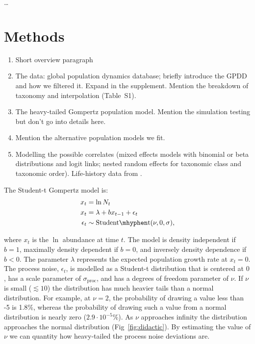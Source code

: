 \documentclass[12pt]{article}
\begin{document}
\citep{doak2008}

\citep{smale2013}

\citep{easterling2000}
\citep{scheffer2003}
\citep{katz2005}

\citep{taleb2007}

\citep{vasseur2014}

\citep{vert-pre2013}
\citep{lindenmayer2010}

\citep{valpine2002}
\citep{gregory2010}
\citet{garcia-carreras2011}
\citet{brook2006}
\citep{herrandoprez2014}

\citep{sibly2005, ziebarth2010}

\ldots

\section{Methods}

\begin{enumerate}
  \item Short overview paragraph
  \item The data: global population dynamics database; briefly introduce the GPDD and how we filtered it. Expand in the supplement. Mention the breakdown of taxonomy and interpolation (Table~S1).
  \item The heavy-tailed Gompertz population model. Mention the simulation testing but don't go into details here.
  \item Mention the alternative population models we fit.
  \item Modelling the possible correlates (mixed effects models with binomial or beta distributions and logit links; nested random effects for taxonomic class and taxonomic order). Life-history data from \citet{brook2006a}.
  \end{enumerate}


The Student-t Gompertz model is:
\begin{align*}
x_t &= \ln N_t\\
x_t &= \lambda + b x_{t-1} + \epsilon_t\\
\epsilon_t &\sim \mathrm{Student\mhyphen t}(\nu, 0, \sigma),
\end{align*}

\noindent where $x_t$ is the $\ln$ abundance at time $t$. The model is density independent if $b = 1$, maximally density dependent if $b = 0$, and inversely density dependence if $b < 0$. The parameter $\lambda$ represents the expected population growth rate at $x_t = 0$. The process noise, $\epsilon_t$, is modelled as a Student-t distribution that is centered at $0$, has a scale parameter of $\sigma_\mathrm{proc}$, and has a degrees of freedom parameter of $\nu$. If $\nu$ is small ($\lesssim 10$) the distribution has much heavier tails than a normal distribution.  For example, at $\nu = 2$, the probability of drawing a value less than -5 is 1.8\%, whereas the probability of drawing such a value from a normal distribution is nearly zero ($2.9\cdot10^{-5}$\%). As $\nu$ approaches infinity the distribution approaches the normal distribution (Fig~\ref{fig:didactic}). By estimating the value of $\nu$ we can quantity how heavy-tailed the process noise deviations are.
\end{document}
